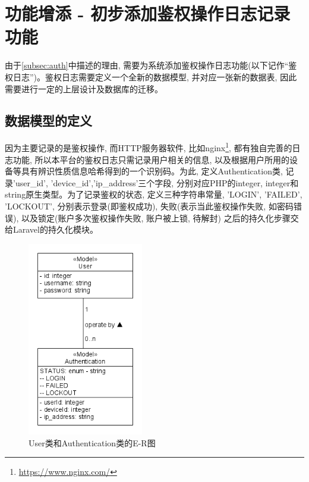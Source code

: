 

\section{功能增添 - 初步添加鉴权操作日志记录功能}

由于\ref{subsec:auth}中描述的理由, 需要为系统添加鉴权操作日志功能(以下记作``鉴权日志'')。鉴权日志需要定义一个全新的数据模型, 并对应一张新的数据表, 因此需要进行一定的上层设计及数据库的迁移。

\subsection{数据模型的定义}

因为主要记录的是鉴权操作, 而HTTP服务器软件, 比如nginx\footnote{\url{https://www.nginx.com/}}, 都有独自完善的日志功能, 所以本平台的鉴权日志只需记录用户相关的信息, 以及根据用户所用的设备等具有辨识性质信息哈希得到的一个识别码。为此, 定义Authentication类, 记录'user\_id', 'device\_id','ip\_address'三个字段, 分别对应PHP的integer, integer和string原生类型。为了记录鉴权的状态, 定义三种字符串常量, 'LOGIN', 'FAILED', 'LOCKOUT', 分别表示登录(即鉴权成功), 失败(表示当此鉴权操作失败, 如密码错误), 以及锁定(账户多次鉴权操作失败, 账户被上锁, 待解封) 之后的持久化步骤交给Laravel的持久化模块。

\begin{figure}[h]
    \centering
    \includegraphics[width=0.45\textwidth]{support-files/4.6.1-authentication-model-png.png}
    \caption{User类和Authentication类的E-R图}
    \label{fig:userauthmodeler}
\end{figure}

